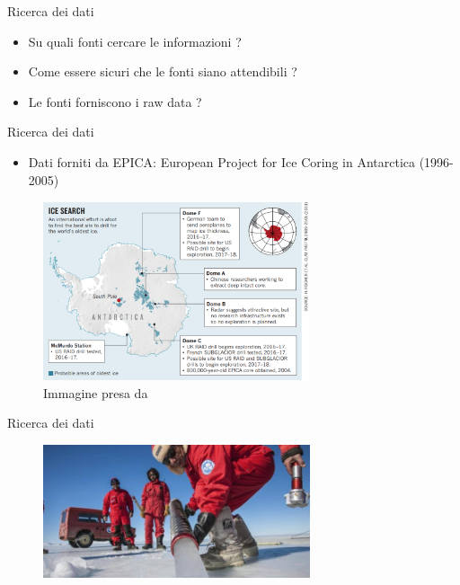 \documentclass{beamer}
\begin{document}
\begin{frame}{Ricerca dei dati}
\begin{itemize}
\item Su quali fonti cercare le informazioni ? 
\item Come essere sicuri che le fonti siano attendibili ? 
\item Le fonti forniscono i raw data ? 
\end{itemize}
\end{frame}

\begin{frame}{Ricerca dei dati}
\begin{itemize}
\item Dati forniti da EPICA: European Project for Ice Coring in Antarctica (1996-2005)
\end{itemize}
\begin{figure}
\begin{center}
\includegraphics[width=0.7\textwidth ]{Pic/EPICAC.png}
\caption{Immagine presa da \cite{EPICAC}}
\end{center}
\end{figure}

\end{frame}


\begin{frame}{Ricerca dei dati}
\begin{figure}
\begin{center}
\includegraphics[width=0.7\textwidth ]{Pic/Carotaggi.jpg}
\end{center}
\end{figure}

\end{frame}
\end{document}
